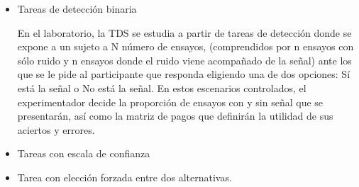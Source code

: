 \begin{itemize}
\item Tareas de detección binaria 

En el laboratorio, la  TDS se estudia a partir  de tareas de detección donde se expone a un  sujeto  a  N  número  de  ensayos,  (comprendidos  por  n  ensayos con  sólo  ruido  y  n  ensayos donde  el  ruido  viene  acompañado  de  la  señal)  ante  los  que  se  le  pide  al  participante  que responda eligiendo una de dos opciones: Sí está la señal o No está la señal. En estos escenarios controlados,  el  experimentador  decide  la  proporción  de  ensayos  con  y  sin  señal  que  se presentarán, así como la matriz de pagos que definirán la utilidad de sus aciertos y errores. \\


\item Tareas con escala de confianza


\item Tarea con elección forzada entre dos alternativas.
\end{itemize}

